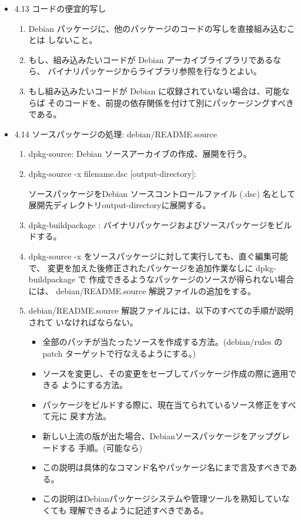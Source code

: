 \documentclass[mingoth,a4paper]{jsarticle}
\begin{document}
\begin{itemize}
\item 4.13 コードの便宜的写し
  \begin{enumerate}
  \item Debian パッケージに、他のパッケージのコードの写しを直接組み込むことは
    しないこと。
  \item もし、組み込みたいコードが Debian アーカイブライブラリであるなら、
    バイナリパッケージからライブラリ参照を行なうとよい。
  \item もし組み込みたいコードが Debian に収録されていない場合は、可能ならば
    そのコードを、前提の依存関係を付けて別にパッケージングすべきである。
  \end{enumerate}

\item 4.14 ソースパッケージの処理: debian/README.source
  \begin{enumerate}
  \item dpkg-source: Debian ソースアーカイブの作成、展開を行う。
  \item dpkg-source -x filename.dsc [output-directory]:

    ソースパッケージをDebian ソースコントロールファイル (.dsc) 名として
    展開先ディレクトリoutput-directoryに展開する。
  \item dpkg-buildpackage :  バイナリパッケージおよびソースパッケージをビルドする。
  \item dpkg-source -x をソースパッケージに対して実行しても、直ぐ編集可能で、
    変更を加えた後修正されたパッケージを追加作業なしに dpkg-buildpackage で
    作成できるようなパッケージのソースが得られない場合には、
    debian/README.source 解説ファイルの追加をする。
  \item debian/README.source 解説ファイルには、以下のすべての手順が説明されて
    いなければならない。
    \begin{itemize}
    \item 全部のパッチが当たったソースを作成する方法。(debian/rules の
      patch ターゲットで行なえるようにする。)
    \item ソースを変更し、その変更をセーブしてパッケージ作成の際に適用できる
      ようにする方法。
    \item パッケージをビルドする際に、現在当てられているソース修正をすべて元に
      戻す方法。
    \item 新しい上流の版が出た場合、Debianソースパッケージをアップグレードする
      手順。(可能なら)
    \item この説明は具体的なコマンド名やパッケージ名にまで言及すべきである。
    \item この説明はDebianパッケージシステムや管理ツールを熟知していなくても
      理解できるように記述すべきである。
    \end{itemize}
  \end{enumerate}
\end{itemize}
\end{document}
